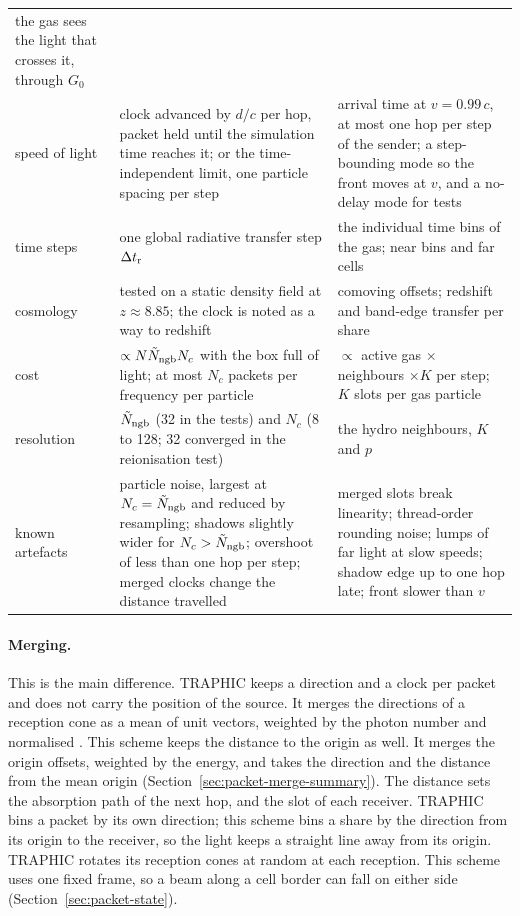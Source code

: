 \begin{table}[!htbp]
\begin{tabular}{>{\raggedright\arraybackslash}p{2.3cm}>{\raggedright\arraybackslash}p{5.9cm}>{\raggedright\arraybackslash}p{5.9cm}}
  the gas sees the light that crosses it, through $G_0$ \\
speed of light & clock advanced by $d/c$ per hop, packet held until the
  simulation time reaches it; or the time-independent limit, one particle
  spacing per step & arrival time at $v=0.99\,c$, at most one hop per step of
  the sender; a step-bounding mode so the front moves at $v$, and a
  no-delay mode for tests \\
time steps & one global radiative transfer step $\Delta t_{\rm r}$ & the
  individual time bins of the gas; near bins and far cells \\
cosmology & tested on a static density field at $z\approx8.85$; the clock is
  noted as a way to redshift & comoving offsets; redshift and band-edge
  transfer per share \\
cost & $\propto N\tilde N_{\rm ngb}N_c$ with the box full of light; at most
  $N_c$ packets per frequency per particle & $\propto$ active gas $\times$
  neighbours $\times K$ per step; $K$ slots per gas particle \\
resolution & $\tilde N_{\rm ngb}$ (32 in the tests) and $N_c$ (8 to 128;
  32 converged in the reionisation test) & the hydro neighbours, $K$ and $p$ \\
known artefacts & particle noise, largest at $N_c=\tilde N_{\rm ngb}$ and
  reduced by resampling; shadows slightly wider for
  $N_c>\tilde N_{\rm ngb}$; overshoot of less than one hop per step; merged
  clocks change the distance travelled & merged
  slots break linearity; thread-order rounding noise; lumps of far light at
  slow speeds; shadow edge up to one hop late; front slower than $v$ \\
\bottomrule
\end{tabular}
\end{table}

\paragraph{Merging.} This is the main difference. TRAPHIC keeps a direction
and a clock per packet and does not carry the position of the source. It
merges the directions of a reception cone as a mean of unit vectors, weighted
by the photon number and normalised \citep[Section~4.2.3]{PawlikSchaye2008}
\citep[footnote~6]{PawlikSchaye2011}. This scheme keeps the distance to the origin
as well. It merges the origin offsets, weighted by the energy, and takes the
direction and the distance from the mean origin
(Section~\ref{sec:packet-merge-summary}). The distance sets the absorption
path of the next hop, and the slot of each receiver. TRAPHIC bins a packet by
its own direction; this scheme bins a share by the direction from its origin
to the receiver, so the light keeps a straight line away from its origin.
TRAPHIC rotates its reception cones at random at each reception. This scheme
uses one fixed frame, so a beam along a cell border can fall on either side
(Section~\ref{sec:packet-state}).

